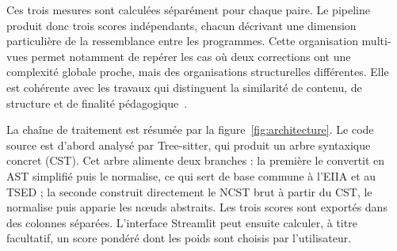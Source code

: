 \documentclass[12pt,a4paper,oneside]{report}
\begin{document}
Ces trois mesures sont calculées séparément pour chaque paire. Le pipeline
produit donc trois scores indépendants, chacun décrivant une dimension
particulière de la ressemblance entre les programmes. Cette organisation
multi-vues permet notamment de repérer les cas où deux corrections ont une
complexité globale proche, mais des organisations structurelles différentes.
Elle est cohérente avec les travaux qui distinguent la similarité de contenu,
de structure et de finalité pédagogique~\cite{pelanek_2020,holyoak_surface_1987}.

La chaîne de traitement est résumée par la figure~\ref{fig:architecture}. Le
code source est d'abord analysé par Tree-sitter, qui produit un arbre
syntaxique concret (CST). Cet arbre alimente deux branches : la première le
convertit en AST simplifié puis le normalise, ce qui sert de base commune à
l'EIIA et au TSED ; la seconde construit directement le NCST brut à partir du
CST, le normalise puis apparie les nœuds abstraits. Les trois scores sont
exportés dans des colonnes séparées. L'interface Streamlit peut ensuite
calculer, à titre facultatif, un score pondéré dont les poids sont choisis par
l'utilisateur.
\end{document}
